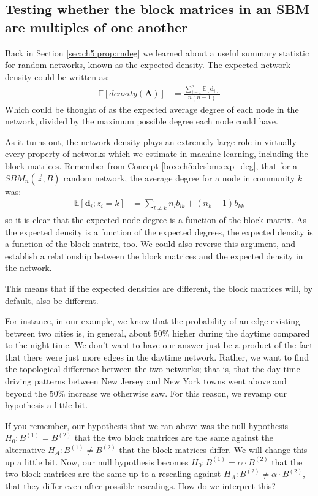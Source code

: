 \subsection{Testing whether the block matrices in an SBM are multiples of one another}

Back in Section \ref{sec:ch5:prop:rndeg} we learned about a useful summary statistic for random networks, known as the expected density. The expected network density could be written as:
\begin{align*}
\mathbb E[density(\mathbf A)] &= \frac{\sum_{i = 1}^n \mathbb E[\mathbf d_i]}{n(n - 1)} 
\end{align*}
Which could be thought of as the expected average degree of each node in the network, divided by the maximum possible degree each node could have. 

As it turns out, the network density plays an extremely large role in virtually every property of networks which we estimate in machine learning, including the block matrices. Remember from Concept \ref{box:ch5:dcsbm:exp_deg}, that for a $SBM_n(\vec z, B)$ random network, the average degree for a node in community $k$ was:
\begin{align*}
    \mathbb E[\mathbf d_i ; z_i = k] &= \sum_{l \neq k} n_l b_{lk} + (n_k - 1)b_{kk}
\end{align*}
so it is clear that the expected node degree is a function of the block matrix. As the expected density is a function of the expected degrees, the expected density is a function of the block matrix, too. We could also reverse this argument, and establish a relationship between the block matrices and the expected density in the network.

This means that if the expected densities are different, the block matrices will, by default, also be different.

For instance, in our example, we know that the probability of an edge existing between two cities is, in general, about $50\%$ higher during the daytime compared to the night time. We don't want to have our answer just be a product of the fact that there were just more edges in the daytime network. Rather, we want to find the topological difference between the two networks; that is, that the day time driving patterns between New Jersey and New York towns went above and beyond the $50\%$ increase we otherwise saw. For this reason, we revamp our hypothesis a little bit.

If you remember, our hypothesis that we ran above was the null hypothesis $H_0: B^{(1)} = B^{(2)}$ that the two block matrices are the same against the alternative $H_A: B^{(1)} \neq B^{(2)}$ that the block matrices differ. We will change this up a little bit. Now, our null hypothesis becomes $H_0: B^{(1)} = \alpha\cdot B^{(2)}$ that the two block matrices are the same up to a rescaling against $H_A: B^{(2)} \neq \alpha\cdot B^{(2)}$, that they differ even after possible rescalings. How do we interpret this?

